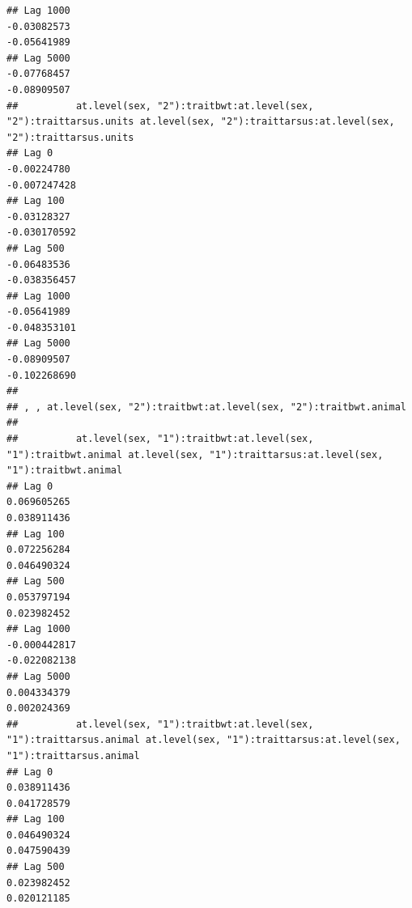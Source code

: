 \documentclass[
  12pt,
]{book}
\begin{document}
\begin{verbatim}
## Lag 1000                                                   -0.03082573                                                      -0.05641989
## Lag 5000                                                   -0.07768457                                                      -0.08909507
##          at.level(sex, "2"):traitbwt:at.level(sex, "2"):traittarsus.units at.level(sex, "2"):traittarsus:at.level(sex, "2"):traittarsus.units
## Lag 0                                                         -0.00224780                                                        -0.007247428
## Lag 100                                                       -0.03128327                                                        -0.030170592
## Lag 500                                                       -0.06483536                                                        -0.038356457
## Lag 1000                                                      -0.05641989                                                        -0.048353101
## Lag 5000                                                      -0.08909507                                                        -0.102268690
## 
## , , at.level(sex, "2"):traitbwt:at.level(sex, "2"):traitbwt.animal
## 
##          at.level(sex, "1"):traitbwt:at.level(sex, "1"):traitbwt.animal at.level(sex, "1"):traittarsus:at.level(sex, "1"):traitbwt.animal
## Lag 0                                                       0.069605265                                                       0.038911436
## Lag 100                                                     0.072256284                                                       0.046490324
## Lag 500                                                     0.053797194                                                       0.023982452
## Lag 1000                                                   -0.000442817                                                      -0.022082138
## Lag 5000                                                    0.004334379                                                       0.002024369
##          at.level(sex, "1"):traitbwt:at.level(sex, "1"):traittarsus.animal at.level(sex, "1"):traittarsus:at.level(sex, "1"):traittarsus.animal
## Lag 0                                                          0.038911436                                                          0.041728579
## Lag 100                                                        0.046490324                                                          0.047590439
## Lag 500                                                        0.023982452                                                          0.020121185

\end{verbatim}
\end{document}
